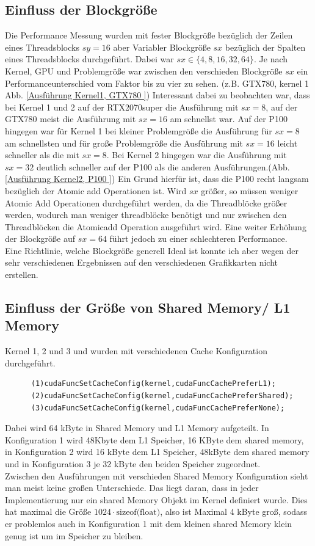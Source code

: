 \documentclass[10pt,a4paper]{article}
\begin{document}
	  \subsection{Einfluss der Blockgröße}
	  Die Performance Messung wurden mit fester Blockgröße bezüglich der Zeilen eines Threadsblocks $sy=16$ aber Variabler Blockgröße $sx$ bezüglich der Spalten eines Threadsblocks durchgeführt. Dabei war $sx\in\{4,8,16,32,64\}$. Je nach Kernel, GPU und Problemgröße war zwischen den verschieden Blockgröße $sx$ ein Performanceunterschied vom Faktor bis zu vier zu sehen. (z.B. GTX780, kernel 1 Abb. \ref{Ausführung Kernel1, GTX780 }) Interessant dabei zu beobachten war, dass bei Kernel 1 und 2 auf der RTX2070super die Ausführung mit $sx=8$, auf der GTX780 meist die Ausführung mit $sx=16$ am schnellst war. Auf der P100 hingegen war für Kernel 1 bei kleiner Problemgröße die Ausführung für $sx=8$ am schnellsten und für große Problemgröße die Ausführung mit $sx=16$ leicht schneller als die mit $sx=8$. Bei Kernel 2 hingegen war die Ausführung mit $sx=32$ deutlich schneller auf der P100 als die anderen Ausführungen.(Abb. \ref{Ausführung Kernel2, P100 }) Ein Grund hierfür ist, dass die P100 recht langsam bezüglich der Atomic add Operationen ist. Wird $sx$ größer, so müssen weniger Atomic Add Operationen durchgeführt werden, da die Threadblöcke größer werden, wodurch man weniger threadblöcke benötigt und nur zwischen den Threadblöcken die Atomicadd Operation ausgeführt wird. Eine weiter Erhöhung der Blockgröße auf $sx=64$ führt jedoch zu einer schlechteren Performance. \\
	  Eine Richtlinie, welche Blockgröße generell Ideal ist konnte ich aber wegen der sehr verschiedenen Ergebnissen auf den verschiedenen Grafikkarten nicht erstellen.
	 
	  \subsection{Einfluss der Größe von Shared Memory/ L1 Memory}
	  Kernel 1, 2 und 3 und wurden mit verschiedenen Cache Konfiguration durchgeführt.
	  \begin{lstlisting}
	  (1)cudaFuncSetCacheConfig(kernel,cudaFuncCachePreferL1);
	  (2)cudaFuncSetCacheConfig(kernel,cudaFuncCachePreferShared);
	  (3)cudaFuncSetCacheConfig(kernel,cudaFuncCachePreferNone);  
	  \end{lstlisting}
		Dabei wird 64 kByte in Shared Memory und L1 Memory aufgeteilt. In Konfiguration 1 wird 48Kbyte dem L1 Speicher, 16 KByte dem shared memory, in Konfiguration 2 wird 16 kByte dem L1 Speicher, 48kByte dem shared memory und in Konfiguration 3 je 32 kByte den beiden Speicher zugeordnet. 
		\\ Zwischen den Ausführungen mit verschieden Shared Memory Konfiguration sieht man meist keine großen Unterschiede. Das liegt daran, dass in jeder Implementierung nur ein shared Memory Objekt im Kernel definiert wurde. Dies hat maximal die Größe $1024\cdot \text {sizeof(float)}$, also ist Maximal 4 kByte groß, sodass er problemlos auch in Konfiguration 1 mit dem kleinen shared Memory klein genug ist um im Speicher zu bleiben.
\end{document}
